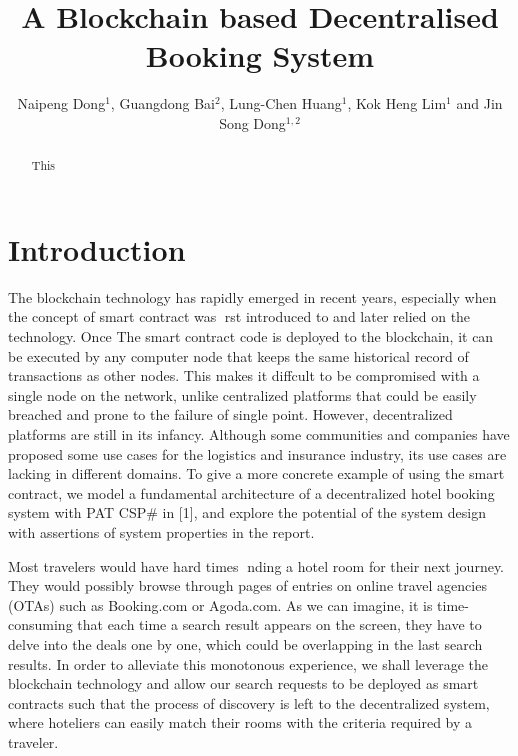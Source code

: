\documentclass{KERauth}
\begin{document}



\title{A Blockchain based Decentralised Booking System}

\author{Naipeng Dong$^1$, Guangdong Bai$^2$, Lung-Chen Huang$^1$, Kok Heng Lim$^1$ and Jin Song Dong$^{1,2}$}
\address{$^1$SoC, National University of Singapore, ~$^2$Griffith University\\
}


\begin{abstract}
This 
\end{abstract}

\section{Introduction}
The blockchain technology has rapidly emerged in recent years, especially when the concept of smart contract
was rst introduced to and later relied on the technology. Once The smart contract code is deployed to the
blockchain, it can be executed by any computer node that keeps the same historical record of transactions as
other nodes. This makes it diffcult to be compromised with a single node on the network, unlike centralized
platforms that could be easily breached and prone to the failure of single point. However, decentralized
platforms are still in its infancy. Although some communities and companies have proposed some use cases
for the logistics and insurance industry, its use cases are lacking in different domains. To give a more concrete
example of using the smart contract, we model a fundamental architecture of a decentralized hotel booking
system with PAT CSP\# in [1], and explore the potential of the system design with assertions of system
properties in the report.

Most travelers would have hard times nding a hotel room for their next journey. They would possibly
browse through pages of entries on online travel agencies (OTAs) such as Booking.com or Agoda.com. As
we can imagine, it is time-consuming that each time a search result appears on the screen, they have to
delve into the deals one by one, which could be overlapping in the last search results. In order to alleviate
this monotonous experience, we shall leverage the blockchain technology and allow our search requests to
be deployed as smart contracts such that the process of discovery is left to the decentralized system, where
hoteliers can easily match their rooms with the criteria required by a traveler.
\end{document}
